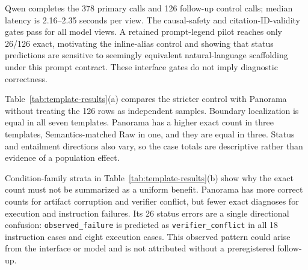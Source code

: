\documentclass[runningheads]{llncs}
\begin{document}
Qwen completes the 378 primary calls and 126 follow-up control calls; median
latency is 2.16--2.35 seconds per view. The causal-safety and
citation-ID-validity gates pass for all model views. A retained prompt-legend
pilot reaches only 26/126 exact, motivating the inline-alias control and showing
that status predictions are sensitive to seemingly equivalent natural-language
scaffolding under this prompt contract. These interface gates do not imply
diagnostic correctness.

Table~\ref{tab:template-results}(a) compares the stricter control with Panorama without
treating the 126 rows as independent samples. Boundary localization is equal in
all seven templates. Panorama has a higher exact count in three templates,
Semantics-matched Raw in one, and they are equal in three. Status and entailment
directions also vary, so the case totals are descriptive rather than evidence of
a population effect.

Condition-family strata in Table~\ref{tab:template-results}(b) show why the exact count
must not be summarized as a uniform benefit. Panorama has more correct counts
for artifact corruption and verifier conflict, but fewer exact diagnoses for
execution and instruction failures. Its 26 status errors are a single
directional confusion:
\texttt{observed\_failure} is predicted as \texttt{verifier\_conflict} in all
18 instruction cases and eight execution cases. This observed pattern could
arise from the interface or model and is not attributed without a preregistered
follow-up.
\end{document}
